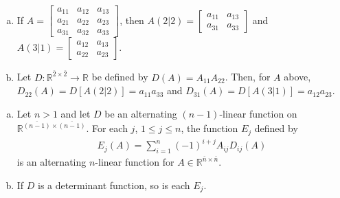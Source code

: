 \documentclass[12pt,letterpaper,reqno]{article}
\numberwithin{equation}{section}
\begin{document}
\begin{example}
\begin{enumerate}[(a)] \hspace{10cm}
	\item If $A=\begin{bmatrix}
		a_{11} & a_{12} & a_{13} \\
		a_{21} & a_{22} & a_{23} \\
		a_{31} & a_{32} & a_{33}
	\end{bmatrix}$, then $A(2|2)=\begin{bmatrix}
		a_{11} & a_{13} \\
		a_{31} & a_{33}
	\end{bmatrix}$ and $A(3|1)=\begin{bmatrix}
		a_{12} & a_{13} \\
		a_{22} & a_{23}
	\end{bmatrix}$.	
	\item Let $D:\mathbb{R}^{\overline{2} \times \overline{2}}\to \mathbb{R}$ be defined by $D(A)=A_{11}A_{22}$. Then, for $A$ above, $D_{22}(A)=D[A(2\vert 2)]=a_{11}a_{33}$ and $D_{31}(A)=D[A(3\vert 1)]=a_{12}a_{23}$.
\end{enumerate}
\end{example}


\begin{thm}\label{thm:def_functions_for_n_gt_1}
\begin{enumerate}[(a)] \hspace{10cm}
	\item Let $n>1$ and let $D$ be an alternating $(n-1)$-linear function on $\mathbb{R}^{\overline{(n-1)} \times \overline{(n-1)}}$. For each $j$, $1 \leq j \leq n$, the function $E_j$ defined by 
	\begin{align*}
		E_j(A)=\sum_{i=1}^n(-1)^{i+j}A_{ij}D_{ij}(A)
	\end{align*}
	is an alternating $n$-linear function for $A \in \mathbb{R}^{\overline{n} \times \overline{n}}$.
	\item If $D$ is a determinant function, so is each $E_j$.
\end{enumerate}
	
\end{thm}
\end{document}
